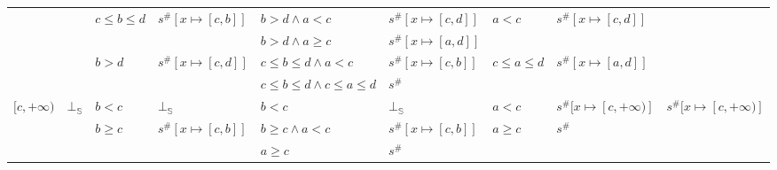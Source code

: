 \documentclass{beamer}
\begin{document}
\begin{frame}
\begin{table}
{\begin{tabular}{|l|l|ll|ll|ll|l|}
                                        &                         & \multirow{2}{*}{$c \le b \le d$} & \multirow{2}{*}{$s^\#[x \mapsto [c, b]]$}       & $b > d \land a < c$                 & $s^\#[x \mapsto [c, d]]$ & \multirow{2}{*}{$a < c$}         & \multirow{2}{*}{$s^\#[x \mapsto [c, d]]$} &                                                 \\
                                        &                         &                                  &                                                 & $b > d \land a \ge c$               & $s^\#[x \mapsto [a, d]]$ &                                  &                                           &                                                 \\
                                        &                         & \multirow{2}{*}{$b > d$}         & \multirow{2}{*}{$s^\#[x \mapsto [c, d]]$}       & $c \le b \le d \land a < c$         & $s^\#[x \mapsto [c, b]]$ & \multirow{2}{*}{$c \le a \le d$} & \multirow{2}{*}{$s^\#[x \mapsto [a, d]]$} &                                                 \\
                                        &                         &                                  &                                                 & $c \le b \le d \land c \le a \le d$ & $s^\#$                   &                                  &                                           &                                                 \\ \hline
        \multirow{3}{*}{$[c, +\infty)$} & \multirow{3}{*}{$\bot_\mathbb{S}$} & $b < c$                          & $\bot_\mathbb{S}$                                          & $b < c$                             & $\bot_\mathbb{S}$                   & $a < c$                          & $s^\#[x \mapsto [c, +\infty)]$            & \multirow{3}{*}{$s^\#[x \mapsto [c, +\infty)]$} \\
                                        &                         & \multirow{2}{*}{$b \ge c$}       & \multirow{2}{*}{$s^\#[x \mapsto [c, b]]$}       & $b \ge c \land a < c$               & $s^\#[x \mapsto [c, b]]$ & \multirow{2}{*}{$a \ge c$}       & \multirow{2}{*}{$s^\#$}                   &                                                 \\
                                        &                         &                                  &                                                 & $a \ge c$                           & $s^\#$                   &                                  &                                           &                                                 \\ \hline

\end{tabular}}
\end{table}
\end{frame}
\end{document}
